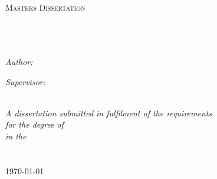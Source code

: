 \documentclass[11pt, a4paper, oneside]{Thesis} %
\begin{document}
\begin{titlepage}
\begin{center}

\textsc{\LARGE \univname}\\[1.5cm] %
\textsc{\Large Masters Dissertation}\\[0.5cm] %

\HRule \\[0.4cm] %
{\huge \bfseries \ttitle}\\[0.4cm] %
\HRule \\[1.5cm] %

\begin{minipage}{0.4\textwidth}
\begin{flushleft} \large
\emph{Author:}\\
\href{http://www.bteres.tk}{\authornames} %
\end{flushleft}
\end{minipage}
\begin{minipage}{0.4\textwidth}
\begin{flushright} \large
\emph{Supervisor:} \\
\href{http://dept.ee.wits.ac.za/~nixon}{\supname} %
\end{flushright}
\end{minipage}\\[3cm]

\large \textit{A dissertation submitted in fulfilment of the requirements\\ for the degree of \degreename}\\[0.3cm] %
\textit{in the}\\[0.4cm]
\groupname\\\deptname\\[2cm] %

{\large \today}\\[4cm] %

\vfill
\end{center}

\end{titlepage}

\end{document}
